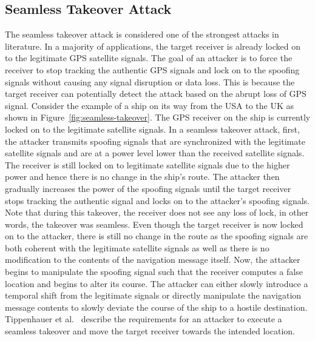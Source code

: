 \documentclass[letterpaper,twocolumn,10pt]{article}
\begin{document}
\subsection{Seamless Takeover Attack}
The seamless takeover attack is considered one of the strongest attacks in literature. In a majority of applications, the target receiver is already locked on to the legitimate GPS satellite signals. The goal of an attacker is to force the receiver to stop tracking the authentic GPS signals and lock on to the spoofing signals without causing any signal disruption or data loss. This is because the target receiver can potentially detect the attack based on the abrupt loss of GPS signal. Consider the example of a ship on its way from the USA to the UK as shown in Figure~\ref{fig:seamless-takeover}. The GPS receiver on the ship is currently locked on to the legitimate satellite signals. In a seamless takeover attack, first, the attacker transmits spoofing signals that are synchronized with the legitimate satellite signals and are at a power level lower than the received satellite signals. The receiver is still locked on to legitimate satellite signals due to the higher power and hence there is no change in the ship's route. The attacker then gradually increases the power of the spoofing signals until the target receiver stops tracking the authentic signal and locks on to the attacker's spoofing signals. Note that during this takeover, the receiver does not see any loss of lock, in other words, the takeover was seamless. Even though the target receiver is now locked on to the attacker, there is still no change in the route as the spoofing signals are both coherent with the legitimate satellite signals as well as there is no modification to the contents of the navigation message itself. Now, the attacker begins to manipulate the spoofing signal such that the receiver computes a false location and begins to alter its course. The attacker can either slowly introduce a temporal shift from the legitimate signals or directly manipulate the navigation message contents to slowly deviate the course of the ship to a hostile destination. Tippenhauer et al.~\cite{Tippenhauer2011} describe the requirements for an attacker to execute a seamless takeover and move the target receiver towards the intended location.
\end{document}
